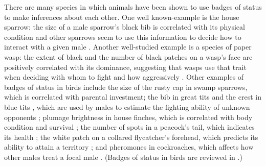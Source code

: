 There are many species in which animals have been shown to use badges of status to make inferences about each other. One well known-example is the house sparrow: the size of a male sparrow's black bib is correlated with its physical condition and other sparrows seem to use this information to decide how to interact with a given male \citep{Moller:1987vn,Veiga:1993fk}. Another well-studied example is a species of paper wasp: the extent of black and the number of black patches on a wasp's face are positively correlated with its dominance, suggesting that wasps use that trait when deciding with whom to fight and how aggressively \citep{Tibbetts:2004kx,Tibbetts:2007zr}. Other examples of badges of status in birds include the size of the rusty cap in swamp sparrows, which is correlated with parental investment\citep{Olsen:2010uq}; the bib in great tits \citep{Lemel:1993ve} and the crest in blue tits \citep{Remy:2010fk}, which are used by males to estimate the fighting ability of unknown opponents \citep{Lemel:1993ve}; plumage brightness in house finches, which is correlated with body condition and survival \citep{McGraw:2000qf}; the number of spots in a peacock's tail, which indicates its health \citep{Loyau:2005nx}; the white patch on a collared flycatcher's forehead, which predicts its ability to attain a territory \citep{Part:1997ys}; and pheromones in cockroaches, which affects how other males treat a focal male \citep{Moore:1997kx}. (Badges of status in birds are reviewed in \citep{Jawor:2003bh,Senar:2006dq,Santos:2011ly,Young:2015dq}.) 


